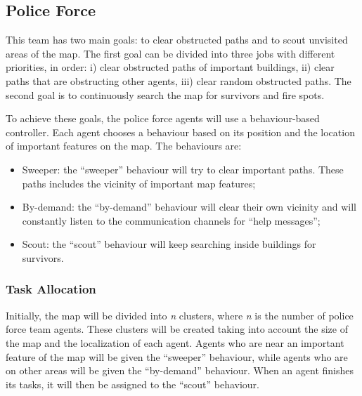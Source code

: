 \subsection{Police Force}
\label{sec:police}
This team has two main goals: to clear obstructed paths and to scout unvisited areas of the map. The first goal can be divided into three jobs with different priorities, in order: i) clear obstructed paths of important buildings, ii) clear paths that are obstructing other agents, iii) clear random obstructed paths. The second goal is to continuously search the map for survivors and fire spots.

To achieve these goals, the police force agents will use a behaviour-based controller. Each agent chooses a behaviour based on its position and the location of important features on the map. The behaviours are:

\begin{itemize}

\item Sweeper: the ``sweeper'' behaviour will try to clear important paths. These paths includes the vicinity of important map features;

\item By-demand: the ``by-demand'' behaviour will clear their own vicinity and will constantly listen to the communication channels for ``help messages'';

\item Scout: the ``scout'' behaviour will keep searching inside buildings for survivors.

\end{itemize}

\subsubsection{Task Allocation}
Initially, the map will be divided into \emph{n} clusters, where \emph{n} is the number of police force team agents. These clusters will be created taking into account the size of the map and the localization of each agent. Agents who are near an important feature of the map will be given the ``sweeper'' behaviour, while agents who are on other areas will be given the ``by-demand'' behaviour. When an agent finishes its tasks, it will then be assigned to the ``scout'' behaviour.

